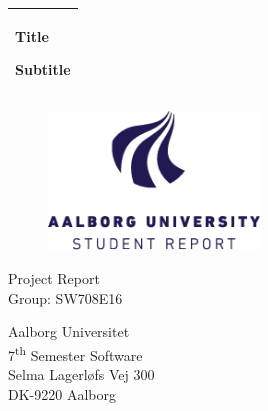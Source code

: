 %
\newcommand{\titlefont}{\sffamily\fontsize{36pt}{0pt}\selectfont}
\newcommand{\subtitlefont}{\sffamily\fontsize{26pt}{0pt}\selectfont}
\newcommand{\otherfont}{\sffamily\fontsize{18pt}{0pt}\selectfont}
\newcommand{\smallfont}{\sffamily\fontsize{12pt}{0pt}\selectfont}
\begin{titlepage}
  \addtolength{\hoffset}{0.5\evensidemargin-0.5\oddsidemargin} %
  \noindent%
  \begin{tabular}{@{}p{\textwidth}@{}}
    \toprule[2pt]
    \midrule
    \vspace{0.2cm}
    \begin{center}
		\titlefont Title		
    \end{center}
	\vspace{0.1cm}
    \begin{center}
		\subtitlefont Subtitle
	\end{center}
    \vspace{0.2cm}\\
    \midrule
    \toprule[2pt]
  \end{tabular}
  \vspace{2 cm}
  \begin{figure}[h!]
    \centering
    \includegraphics[width=0.5\textwidth]{img/aau-logo-english.png}
  \end{figure}
  \vspace{3 cm}
  \begin{center}
    \otherfont
      Project Report
    \\
    \vspace{0.2cm}
    \otherfont
      Group: SW708E16
  \end{center}
  \vfill
  \begin{center}
  \smallfont
  Aalborg Universitet\\
  7\textsuperscript{th} Semester Software\\ \vspace{0.1cm}
  Selma Lagerløfs Vej 300\\
  DK-9220 Aalborg
  \end{center}
\end{titlepage}
\clearpage
\cleardoublepage
